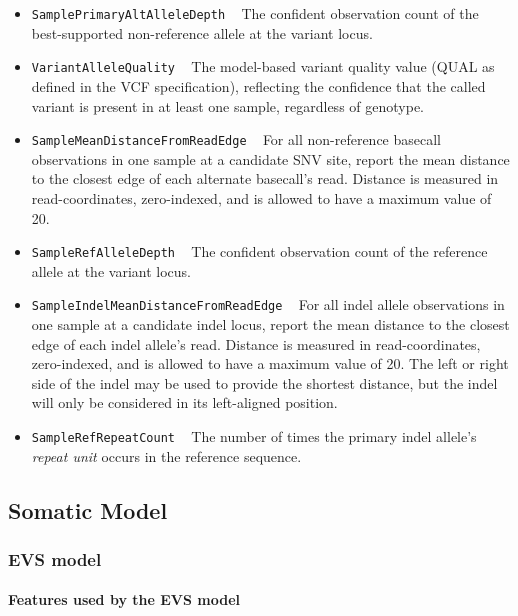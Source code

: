 \documentclass{article}
\begin{document}
\begin{itemize}
\item \texttt{SamplePrimaryAltAlleleDepth} ~ The confident observation count of the best-supported non-reference allele at the variant locus.

\item \texttt{VariantAlleleQuality} ~ The model-based variant quality value (QUAL as defined in the VCF specification), reflecting the confidence that the called variant is present in at least one sample, regardless of genotype.

\item \texttt{SampleMeanDistanceFromReadEdge} ~ For all non-reference basecall observations in one sample at a candidate SNV site, report the mean distance to the closest edge of each alternate basecall's read. Distance is measured in read-coordinates, zero-indexed, and is allowed to have a maximum value of 20.

\item \texttt{SampleRefAlleleDepth} ~ The confident observation count of the reference allele at the variant locus.

\item \texttt{SampleIndelMeanDistanceFromReadEdge} ~ For all indel allele observations in one sample at a candidate indel locus, report the mean distance to the closest edge of each indel allele's read. Distance is measured in read-coordinates, zero-indexed, and is allowed to have a maximum value of 20. The left or right side of the indel may be used to provide the shortest distance, but the indel will only be considered in its left-aligned position.

\item \texttt{SampleRefRepeatCount} ~ The number of times the primary indel allele's \emph{repeat unit} occurs in the reference sequence.

\end{itemize}


\subsection{Somatic Model}

\subsubsection{EVS model}

\paragraph{Features used by the EVS model}
\end{document}
